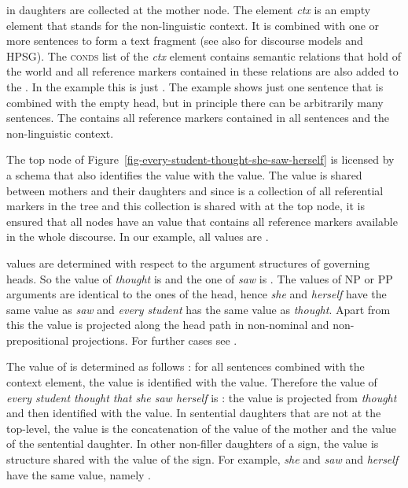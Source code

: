 \documentclass[output=paper
	        ,collection
	        ,collectionchapter
 	        ,biblatex
                ,babelshorthands
                ,newtxmath
                ,draftmode
                ,colorlinks, citecolor=brown
]{langscibook}
\begin{document}
in daughters are collected at the mother node. The element \emph{ctx} is an empty element that
stands for the non-linguistic context. It is combined with one or more sentences to form a text
fragment (see also  for discourse models and HPSG). The \textsc{conds}
list of the \emph{ctx} element contains semantic relations that hold of the world and all reference
markers contained in these relations are also added to the \listlul. In the example this is just
. The example shows just one sentence that is combined with the empty head, but in principle
there can be arbitrarily many sentences. The \listlul contains all reference markers contained in
all sentences and the non-linguistic context. 

The top node of Figure~\ref{fig-every-student-thought-she-saw-herself} is licensed by a schema that
also identifies the \listu value with the \listlu value. The \listu value is shared between mothers
and their daughters and since \listlu is a collection of all referential markers in the tree and
this collection is shared with \listu at the top node, it is ensured that all nodes have an \listu
value that contains all reference markers available in the whole discourse. In our example, all
\listu values are .

\lista values are determined with respect to the argument structures of governing heads. So the
\lista value of \emph{thought} is  and the one of \emph{saw} is
. The \lista values of NP or PP arguments are identical to the ones of the head,
hence \emph{she} and \emph{herself} have the same \lista value as \emph{saw} and \emph{every
  student} has the same \lista value as \emph{thought}. Apart from this the \lista value is
projected along the head path in non-nominal and non-prepositional projections. For further cases
see \citet[]{Branco2002a}.

The value of \listz is determined as follows \citep[]{Branco2002a}: for all sentences combined with the context element,
the \listz value is identified with the \lista value. Therefore the \listz value of \emph{every
  student thought that she saw herself} is : the \lista value is
projected from \emph{thought} and then identified with the \listz value. In sentential daughters
that are not at the top-level, the \listz value is the concatenation of the \listz value of the
mother and the \lista value of the sentential daughter. In other non-filler daughters of a sign, the
\listz value is structure shared with the \listz value of the sign. For example, \emph{she} and
\emph{saw} and \emph{herself} have the same \listz value, namely .
\end{document}
